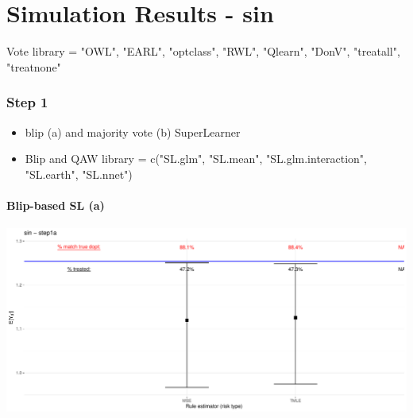 \documentclass[11pt]{article}\usepackage[]{graphicx}\usepackage[]{color}
\makeatletter
\def\maxwidth{ %
  \ifdim\Gin@nat@width>\linewidth
    \linewidth
  \else
    \Gin@nat@width
  \fi
}
\makeatother
\begin{document}
\part*{Simulation Results - sin}

Vote library = "OWL", "EARL", "optclass", "RWL", "Qlearn", "DonV", "treatall", "treatnone"




\section{Step 1}

\begin{itemize}
\item blip (a) and majority vote (b) SuperLearner
\item Blip and QAW library = c("SL.glm", "SL.mean", "SL.glm.interaction", "SL.earth", "SL.nnet")
\end{itemize}




\subsection{Blip-based SL (a)}

\includegraphics[width=\maxwidth]{figure/ODTR_DGP_sin_step1a-1} 
\begin{table}[ht]
\centering
{}
\caption{sin - step1a} 
\end{table}
\end{document}
